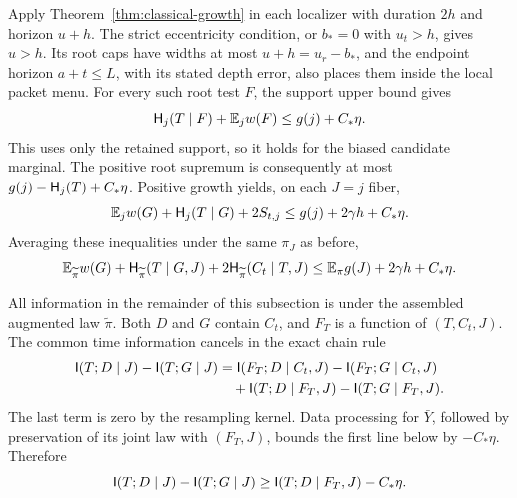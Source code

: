 Apply Theorem~\ref{thm:classical-growth} in each localizer with
duration \(2h\) and horizon \(u+h\).  The strict eccentricity
condition, or \(b_*=0\) with \(u_t>h\), gives \(u>h\).
Its root caps have widths at most
\(u+h=u_r-b_*\), and the endpoint horizon \(a+t\le L\), with its
stated depth error, also places them inside the local packet menu.
For every such root test \(F\), the support upper bound gives
\[
 \mathsf H_j(T\mid F)+\mathbb E_j w(F)\le g(j)+C_*\eta.
\]
This uses only the retained support, so it holds for the biased
candidate marginal.  The positive root supremum is consequently at
most \(g(j)-\mathsf H_j(T)+C_*\eta\).  Positive growth yields, on
each \(J=j\) fiber,
\begin{equation}
 \mathbb E_j w(G)+\mathsf H_j(T\mid G)+2S_{t,j}
       \le g(j)+2\gamma h+C_*\eta .
 \label{eq:faithful-classical-bound}
\end{equation}
Averaging these inequalities under the same \(\pi_J\) as before,
\begin{equation}
 \mathbb E_{\widetilde\pi}w(G)+\mathsf H_{\widetilde\pi}(T\mid G,J)
       +2\mathsf H_{\widetilde\pi}(C_t\mid T,J)
 \le \mathbb E_\pi g(J)+2\gamma h+C_*\eta .
 \label{eq:faithful-classical-bound-averaged}
\end{equation}

All information in the remainder of this subsection is under the
assembled augmented law \(\widetilde\pi\).  Both \(D\) and \(G\)
contain \(C_t\), and \(F_T\) is a function of \((T,C_t,J)\).
The common time information cancels in the exact chain rule
\begin{align}
 \mathsf I(T;D\mid J)-\mathsf I(T;G\mid J)
 &=\mathsf I(F_T;D\mid C_t,J)-\mathsf I(F_T;G\mid C_t,J)
       \notag\\
 &\quad+\mathsf I(T;D\mid F_T,J)-\mathsf I(T;G\mid F_T,J).
 \label{eq:time-correct-information-splitting}
\end{align}
The last term is zero by the resampling kernel.  Data processing
for \(\bar Y\), followed by preservation of its joint law with
\((F_T,J)\), bounds the first line below by \(-C_*\eta\).
Therefore
\begin{equation}
 \mathsf I(T;D\mid J)-\mathsf I(T;G\mid J)
       \ge \mathsf I(T;D\mid F_T,J)-C_*\eta .
 \label{eq:information-before-credit}
\end{equation}

